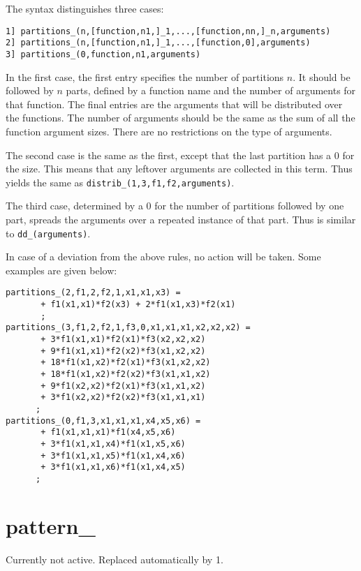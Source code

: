 The syntax distinguishes three cases:
\begin{verbatim}
1] partitions_(n,[function,n1,]_1,...,[function,nn,]_n,arguments)
2] partitions_(n,[function,n1,]_1,...,[function,0],arguments)
3] partitions_(0,function,n1,arguments)
\end{verbatim}
In the first case, the first entry specifies the number of partitions $n$.
It should be followed by $n$ parts, defined by a function name
and the number of arguments for that function. The final entries are the arguments
that will be distributed over the functions.
The number of arguments should be the same as the sum of
all the function argument sizes.
There are no restrictions on the type of arguments.

The second case is the same as the first, except that the last partition
has a 0 for the size. This means that any leftover arguments are collected
in this term. Thus  yields the same
as \texttt{distrib\_(1,3,f1,f2,arguments)}.

The third case, determined by a 0 for the number of partitions followed by one part, spreads
the arguments over a repeated instance of that part. Thus  is similar to \texttt{dd\_(arguments)}.

In case of a deviation from the above rules, no action will be taken.
Some examples are given below:
\begin{verbatim}
partitions_(2,f1,2,f2,1,x1,x1,x3) =
       + f1(x1,x1)*f2(x3) + 2*f1(x1,x3)*f2(x1)
       ;
partitions_(3,f1,2,f2,1,f3,0,x1,x1,x1,x2,x2,x2) =
       + 3*f1(x1,x1)*f2(x1)*f3(x2,x2,x2)
       + 9*f1(x1,x1)*f2(x2)*f3(x1,x2,x2)
       + 18*f1(x1,x2)*f2(x1)*f3(x1,x2,x2)
       + 18*f1(x1,x2)*f2(x2)*f3(x1,x1,x2)
       + 9*f1(x2,x2)*f2(x1)*f3(x1,x1,x2)
       + 3*f1(x2,x2)*f2(x2)*f3(x1,x1,x1)
      ;
partitions_(0,f1,3,x1,x1,x1,x4,x5,x6) =
       + f1(x1,x1,x1)*f1(x4,x5,x6)
       + 3*f1(x1,x1,x4)*f1(x1,x5,x6)
       + 3*f1(x1,x1,x5)*f1(x1,x4,x6)
       + 3*f1(x1,x1,x6)*f1(x1,x4,x5)
      ;
\end{verbatim}



\section{pattern\_}
\label{funpattern}
\noindent Currently not active. Replaced automatically by 1.

